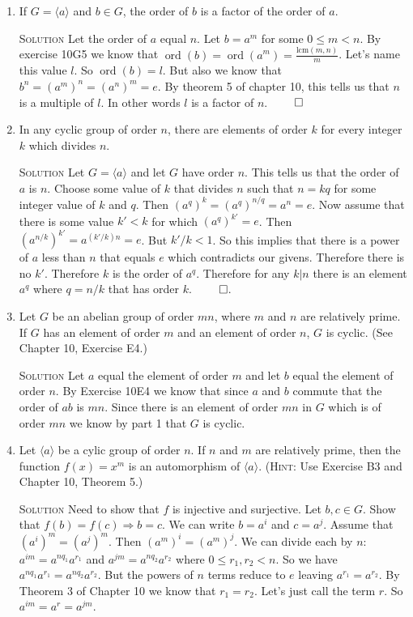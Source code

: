 \documentclass[twoside]{amsart}
\newcommand{\solution}{\textsc{Solution}\xspace}
\newcommand{\blank}{\vspace{5pt}}
\newcommand{\itm}{\blank\item}
\newcommand{\sol}{\blank\noindent\solution}
\newcommand{\ord}{\mathop{\mathrm{ord}}}
\newcommand{\cgroup}[1]{\langle #1 \rangle}
\begin{document}
\begin{enumerate}[A.]
\begin{enumerate}[1)]
      \itm If $G = \langle a \rangle$ and $b \in G$, the order of $b$
      is a factor of the order of $a$.

      \sol Let the order of $a$ equal $n$. Let $b=a^m$ for some $0 \le m < n$.
      By exercise 10G5 we know that $\ord(b) = \ord(a^m) =
      \frac{\mathrm{lcm}(m,n)}{m}$.  Let's name this value $l$.
      So $\ord(b)=l$. But also we know that $b^n = (a^m)^n = (a^n)^m = e$.
      By theorem 5 of chapter 10, this tells us that $n$ is a multiple of
      $l$. In other words $l$ is a factor of $n$. $\qed$

      \itm In any cyclic group of order $n$, there are elements of order $k$
      for every integer $k$ which divides $n$.

      \sol Let $G = \langle a \rangle$ and let $G$ have order $n$. 
      This tells us that the order of $a$ is $n$.
      Choose some value of $k$ that divides $n$ such that 
      $n = kq$ for some integer value of $k$ and $q$. Then
      $(a^q)^k = (a^q)^{n/q} = a^n = e$. Now assume that there
      is some value $k' < k$ for which $(a^q)^{k'} = e$. Then
      $(a^{n/k})^{k'} = a^{(k'/k)n} = e$. But $k'/k < 1$. So this implies
      that there is a power of $a$ less than $n$ that equals $e$ which
      contradicts our givens. Therefore there is no $k'$. Therefore
      $k$ is the order of $a^q$. Therefore for any $k | n$ there is
      an element $a^q$ where $q = n/k$ that has order $k$. $\qed$.

      \itm Let $G$ be an abelian group of order $mn$, where $m$ and $n$
      are relatively prime. If $G$ has an element of order $m$
      and an element of order $n$, $G$ is cyclic. (See Chapter 10,
      Exercise E4.)

      \sol Let $a$ equal the element of order $m$ and let $b$ equal the
      element of order $n$. By Exercise 10E4 we know that since $a$ and
      $b$ commute that the order of $ab$ is $mn$. Since there is an element
      of order $mn$ in $G$ which is of order $mn$ we know by part 1
      that $G$ is cyclic.

      \itm Let $\cgroup{ a }$ be a cylic group of order $n$. 
      If $n$ and $m$ are relatively prime, then the function $f(x) =
      x^m$ is an automorphism of $\cgroup{ a }$. (\textsc{Hint}: Use
      Exercise B3 and Chapter 10, Theorem 5.)

      \sol Need to show that $f$ is injective and surjective.
      Let $b,c \in G$. Show that $f(b) = f(c) \Rightarrow b = c$.
      We can write $b = a^i$ and $c = a^j$. Assume 
      that $(a^i)^m = (a^j)^m$.  Then $(a^m)^i = (a^m)^j$.
      We can divide each by $n$: 
      $a^{im} = a^{nq_1}a^{r_1}$ and $a^{jm} = a^{nq_2}a^{r_2}$ where
      $0 \le r_1, r_2 < n$. So we have 
      $a^{nq_1}a^{r_1} = a^{nq_2}a^{r_2}$. But the powers of $n$ terms
      reduce to $e$ leaving $a^{r_1}=a^{r_2}$. By Theorem 3 of Chapter 10
      we know that $r_1 = r_2$. Let's just call the term $r$.
      So $a^{im} = a^r = a^{jm}$.


\end{enumerate}
\end{enumerate}
\end{document}
